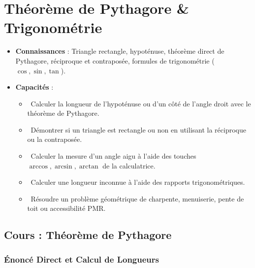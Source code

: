 \chapter{Théorème de Pythagore \& Trigonométrie}
\label{chap:pythagore_trigo}

\begin{cadreretenu}
\begin{itemize}
    \item \textbf{Connaissances} : Triangle rectangle, hypoténuse, théorème direct de Pythagore, réciproque et contraposée, formules de trigonométrie ($\cos, \sin, \tan$).
    \item \textbf{Capacités} :
    \begin{itemize}
        \item \capRealiser\ Calculer la longueur de l'hypoténuse ou d'un côté de l'angle droit avec le théorème de Pythagore.
        \item \capAnalyser\ Démontrer si un triangle est rectangle ou non en utilisant la réciproque ou la contraposée.
        \item \capRealiser\ Calculer la mesure d'un angle aigu à l'aide des touches $\arccos, \arcsin, \arctan$ de la calculatrice.
        \item \capRealiser\ Calculer une longueur inconnue à l'aide des rapports trigonométriques.
        \item \capValider\ Résoudre un problème géométrique de charpente, menuiserie, pente de toit ou accessibilité PMR.
    \end{itemize}
\end{itemize}
\end{cadreretenu}

\vspace{0.3cm}

\section{Cours : Théorème de Pythagore}

\subsection{Énoncé Direct et Calcul de Longueurs}


